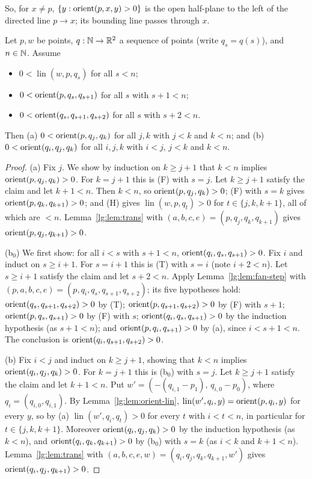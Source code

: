 So, for $x\ne p$, $\{y:\operatorname{orient}(p,x,y)>0\}$ is the open half-plane to the left of the directed line $p\to x$; its
bounding line passes through $x$.

\begin{lemma}\label{lg:lem:fan-pos}
Let $p,w$ be points, $q:\mathbb N\to\mathbb R^2$ a sequence of points (write $q_s=q(s)$), and $n\in\mathbb N$. Assume
\begin{itemize}
\item[(H)] $0<\operatorname{lin}(w,p,q_s)$ for all $s<n$;
\item[(F)] $0<\operatorname{orient}(p,q_s,q_{s+1})$ for all $s$ with $s+1<n$;
\item[(T)] $0<\operatorname{orient}(q_s,q_{s+1},q_{s+2})$ for all $s$ with $s+2<n$.
\end{itemize}
Then (a) $0<\operatorname{orient}(p,q_j,q_k)$ for all $j,k$ with $j<k$ and $k<n$; and (b) $0<\operatorname{orient}(q_i,q_j,q_k)$ for all $i,j,k$
with $i<j$, $j<k$ and $k<n$.
\end{lemma}

\begin{proof}
(a) Fix $j$. We show by induction on $k\ge j+1$ that $k<n$ implies $\operatorname{orient}(p,q_j,q_k)>0$. For $k=j+1$ this is (F)
with $s=j$. Let $k\ge j+1$ satisfy the claim and let $k+1<n$. Then $k<n$, so $\operatorname{orient}(p,q_j,q_k)>0$; (F) with $s=k$
gives $\operatorname{orient}(p,q_k,q_{k+1})>0$; and (H) gives $\operatorname{lin}(w,p,q_t)>0$ for $t\in\{j,k,k+1\}$, all of which
are $<n$. Lemma~\ref{lg:lem:trans} with $(a,b,c,e)=(p,q_j,q_k,q_{k+1})$ gives $\operatorname{orient}(p,q_j,q_{k+1})>0$.

(b$_0$) We first show: for all $i<s$ with $s+1<n$, $\operatorname{orient}(q_i,q_s,q_{s+1})>0$. Fix $i$ and induct on $s\ge i+1$. For
$s=i+1$ this is (T) with $s=i$ (note $i+2<n$). Let $s\ge i+1$ satisfy the claim and let $s+2<n$. Apply
Lemma~\ref{lg:lem:fan-step} with $(p,a,b,c,e)=(p,q_i,q_s,q_{s+1},q_{s+2})$; its five hypotheses hold:
$\operatorname{orient}(q_s,q_{s+1},q_{s+2})>0$ by (T); $\operatorname{orient}(p,q_{s+1},q_{s+2})>0$ by (F) with $s+1$; $\operatorname{orient}(p,q_s,q_{s+1})>0$ by
(F) with $s$; $\operatorname{orient}(q_i,q_s,q_{s+1})>0$ by the induction hypothesis (as $s+1<n$); and $\operatorname{orient}(p,q_i,q_{s+1})>0$ by
(a), since $i<s+1<n$. The conclusion is $\operatorname{orient}(q_i,q_{s+1},q_{s+2})>0$.

(b) Fix $i<j$ and induct on $k\ge j+1$, showing that $k<n$ implies $\operatorname{orient}(q_i,q_j,q_k)>0$. For $k=j+1$ this is
(b$_0$) with $s=j$. Let $k\ge j+1$ satisfy the claim and let $k+1<n$. Put $w'=(-(q_{i,1}-p_1),\,q_{i,0}-p_0)$, where
$q_i=(q_{i,0},q_{i,1})$. By Lemma~\ref{lg:lem:orient-lin}, $\operatorname{lin}(w',q_i,y)=\operatorname{orient}(p,q_i,y)$ for every $y$,
so by (a) $\operatorname{lin}(w',q_i,q_t)>0$ for every $t$ with $i<t<n$, in particular for $t\in\{j,k,k+1\}$. Moreover
$\operatorname{orient}(q_i,q_j,q_k)>0$ by the induction hypothesis (as $k<n$), and $\operatorname{orient}(q_i,q_k,q_{k+1})>0$ by (b$_0$) with
$s=k$ (as $i<k$ and $k+1<n$). Lemma~\ref{lg:lem:trans} with $(a,b,c,e,w)=(q_i,q_j,q_k,q_{k+1},w')$ gives
$\operatorname{orient}(q_i,q_j,q_{k+1})>0$.
\end{proof}

